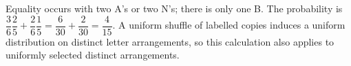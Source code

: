 Equality occurs with two A's or two N's; there is only one B. The probability is $\dfrac{3}{6}\dfrac{2}{5}+\dfrac{2}{6}\dfrac{1}{5}=\dfrac{6}{30}+\dfrac{2}{30}=\boxed{\dfrac{4}{15}}$. A uniform shuffle of labelled copies induces a uniform distribution on distinct letter arrangements, so this calculation also applies to uniformly selected distinct arrangements.
